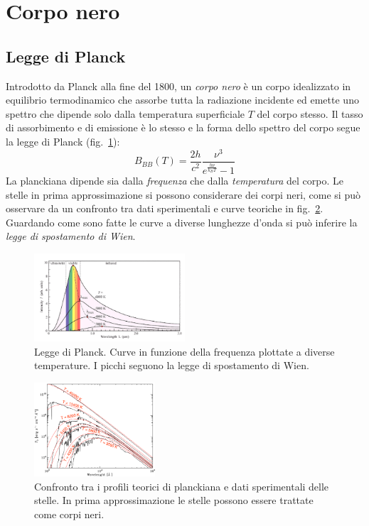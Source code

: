 \section{Corpo nero}\label{sec:corpo-nero}

\subsection{Legge di Planck}\label{sec:legge-planck}
Introdotto da Planck alla fine del 1800, un \emph{corpo nero} è un corpo idealizzato in equilibrio termodinamico che assorbe tutta la radiazione incidente ed emette uno spettro che dipende solo dalla temperatura superficiale $T$ del corpo stesso. Il tasso di assorbimento e di emissione è lo stesso e la forma dello spettro del corpo segue la legge di Planck (fig.~\ref{fig:corpo-nero}):
\begin{equation}\label{eq:corpo-nero}
    B_{BB} (T) = \frac{2 h}{c^2} \frac{\nu^3}{e^{\frac{h \nu}{k_B T}} - 1}
\end{equation}
La planckiana dipende sia dalla \emph{frequenza} che dalla \emph{temperatura} del corpo. Le stelle in prima approssimazione si possono considerare dei corpi neri, come si può osservare da un confronto tra dati sperimentali e curve teoriche in fig.~\ref{fig:stelle-corpi-neri}. Guardando come sono fatte le curve a diverse lunghezze d'onda si può inferire la \emph{legge di spostamento di Wien}.

\begin{figure}
\centering
\includegraphics[width=0.5\textwidth]{immagini/corpo-nero.png}
\caption{Legge di Planck. Curve in funzione della frequenza plottate a diverse temperature. I picchi seguono la legge di spostamento di Wien.}
\label{fig:corpo-nero}
\end{figure}

\begin{figure}
\centering
\includegraphics[width=0.4\textwidth]{immagini/stelle-corpi-neri.png}
\caption{Confronto tra i profili teorici di planckiana e dati sperimentali delle stelle. In prima approssimazione le stelle possono essere trattate come corpi neri.}
\label{fig:stelle-corpi-neri}
\end{figure}

